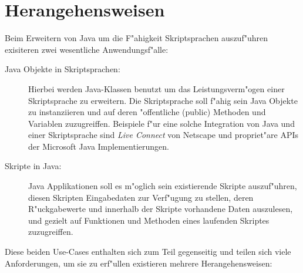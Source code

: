 \section{Herangehensweisen}
\label{sec:javanscripts:ucs}
Beim Erweitern von Java um die F"ahigkeit Skriptsprachen auszuf"uhren exisiteren zwei wesentliche Anwendungsf"alle:
\begin{description}
\item[Java Objekte in Skriptsprachen:]
Hierbei werden Java-Klassen benutzt um das Leistungsverm"ogen einer Skriptsprache zu erweitern. Die Skriptsprache
soll f"ahig sein Java Objekte zu instanziieren und auf deren "offentliche (public) Methoden und Variablen 
zuzugreiffen. Beispiele f"ur eine solche Integration von Java und einer Skriptsprache sind \emph{Live Connect} von
Netscape und propriet"are APIs der Microsoft Java Implementierungen.
\item[Skripte in Java:]
Java Applikationen soll es m"oglich sein existierende Skripte auszuf"uhren, diesen Skripten Eingabedaten
zur Verf"ugung zu stellen, deren R"uckgabewerte und innerhalb der Skripte vorhandene Daten auszulesen, 
und gezielt auf Funktionen und Methoden eines laufenden Skriptes zuzugreiffen.
\end{description}
Diese beiden Use-Cases enthalten sich zum Teil gegenseitig und teilen sich viele Anforderungen, um sie
zu erf"ullen existieren mehrere Herangehensweisen:
